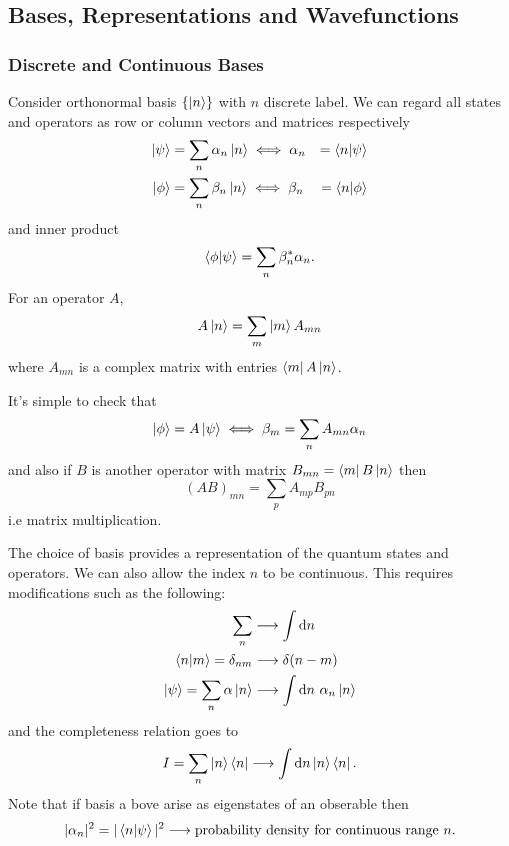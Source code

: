 \documentclass{article}
\begin{document}
\subsection{Bases, Representations and Wavefunctions}
\subsubsection{Discrete and Continuous Bases}
Consider orthonormal basis $ \{\ket n\} $ with $ n $ discrete label. We can regard all states and operators as row or column vectors and matrices respectively
\begin{align*}
	\ket{\psi} &= \sum_n \alpha_n \ket{n} \iff \alpha_n &= \bra{n}\ket{\psi} \\
	\ket{\phi} &= \sum_n \beta_n\ket{n} \iff \beta_n &= \bra{n}\ket{\phi} \\
\end{align*}
and inner product
\[
	\bra{\phi}\ket{\psi} = \sum_n \beta_n^*\alpha_n.
\]
For an operator $ A $,
\[
	A\ket n = \sum_m \ket m A_{mn}
\]
where $ A_{mn} $ is a complex matrix with entries $ \bra{m}A\ket{n} $.\par
It's simple to check that
\[
	\ket \phi = A \ket \psi \iff \beta_{m} = \sum_n A_{mn} \alpha_n
\]
and also if $ B $ is another operator with matrix $ B_{mn} = \bra m B\ket n $ then
\[
	(AB)_{mn} = \sum_p A_{mp}B_{pn}
\]
i.e matrix multiplication.\par
The choice of basis provides a representation of the quantum states and operators. We can also allow the index $ n $ to be continuous. This requires modifications such as the following:
\begin{align*}
	\sum_n  &\longrightarrow \int \mathrm dn \\
	\bra {n}\ket {m} = \delta_{nm} &\longrightarrow \delta(n-m) \\
	\ket \psi = \sum_n \alpha\ket n &\longrightarrow \int \mathrm dn \ \alpha_n \ket n \\
\end{align*}
and the completeness relation goes to
\[
  I = \sum_n \ket n \bra n \longrightarrow \int \mathrm dn \ket n \bra n.
\]
Note that if basis a bove arise as eigenstates of an obserable then
\[
	|\alpha_n|^2 = |\bra{n}\ket{\psi}|^2 \longrightarrow \text{probability density for continuous range } n.
\]
\end{document}
